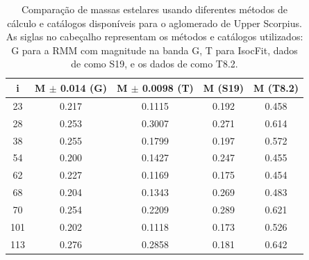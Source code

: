 \begin{table}[htbp]
\centering
\caption[Resultados de massas estelares para Upper Scorpius]{Comparação de massas estelares usando diferentes métodos de cálculo e catálogos disponíveis para o aglomerado de Upper Scorpius. As siglas no cabeçalho representam os métodos e catálogos utilizados: G para a RMM com magnitude na banda G, T para IsocFit, dados de  como S19, e os dados de   como T8.2.}
\label{tab:usco_massas}
\begin{tabular}{ccccc}
\hline
{i} & {M $\pm$ 0.014 (G)} & {M $\pm$ 0.0098 (T)} & {M (S19)} & {M (T8.2)} \\
\hline
        23  & 0.217 & 0.1115 & 0.192 & 0.458 \\
		28  & 0.253 & 0.3007 & 0.271 & 0.614 \\
		38  & 0.255 & 0.1799 & 0.197 & 0.572 \\
		54  & 0.200 & 0.1427 & 0.247 & 0.455 \\
		62  & 0.227 & 0.1169 & 0.175 & 0.454 \\
		68  & 0.204 & 0.1343 & 0.269 & 0.483 \\
		70  & 0.254 & 0.2209 & 0.289 & 0.621 \\
		101 & 0.202 & 0.1118 & 0.173 & 0.526 \\
		113 & 0.276 & 0.2858 & 0.181 & 0.642 \\
\hline
\end{tabular}
\end{table}
